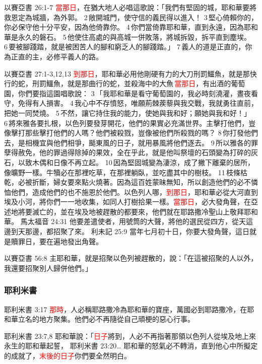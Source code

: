 以賽亞書 26:1-7
\textcolor{red}{當那日}，在猶大地人必唱這歌說：「我們有堅固的城，耶和華要將救恩定為城牆，為外郭。 2 敞開城門，使守信的義民得以進入！ 3 堅心倚賴你的，你必保守他十分平安，因為他倚靠你。 4 你們當倚靠耶和華，直到永遠，因為耶和華是永久的磐石。 5 他使住高處的與高城一併敗落，將城拆毀，拆平直到塵埃。 6 要被腳踐踏，就是被困苦人的腳和窮乏人的腳踐踏。」 7 義人的道是正直的，你為正直的主，必修平義人的路。

以賽亞書 27:1-3,12,13
\textcolor{red}{到那日}，耶和華必用他剛硬有力的大刀刑罰鱷魚，就是那快行的蛇，刑罰鱷魚，就是那曲行的蛇，並殺海中的大魚\textcolor{red}{ 當那日}，有出酒的葡萄園，你們要指這園唱歌說： 3 「我耶和華是看守葡萄園的，我必時刻澆灌，晝夜看守，免得有人損害。 4 我心中不存憤怒，唯願荊棘蒺藜與我交戰，我就勇往直前，把她一同焚燒。 5 不然，讓它持住我的能力，使她與我和好；願她與我和好！」 6 將來雅各要扎根，以色列要發芽開花，他們的果實必充滿世界。主擊打他們，豈像擊打那些擊打他們的人嗎？他們被殺戮，豈像被他們所殺戮的嗎？ 8 你打發他們去，是相機宜與他們相爭，颳東風的日子，就用暴風將他們逐去。 9 所以雅各的罪孽得赦免，他的罪過得除掉的果效，全在乎此，就是他叫祭壇的石頭變為打碎的灰石，以致木偶和日像不再立起。 10 因為堅固城變為淒涼，成了撇下離棄的居所，像曠野一樣。牛犢必在那裡吃草，在那裡躺臥，並吃盡其中的樹枝。 11 枝條枯乾，必被折斷，婦女要來點火燒著。因為這百姓蒙昧無知，所以創造他們的必不憐恤他們，造成他們的也不施恩於他們。以色列人哪，\textcolor{red}{到那日}，耶和華必從大河直到埃及小河，將你們一一地收集，如同人打樹拾果一樣。\textcolor{red}{當那日}，必大發角聲，在亞述地將要滅亡的，並在埃及地被趕散的都要來，他們就在耶路撒冷聖山上敬拜耶和華。
馬太福音 24:31
他要差遣使者，用號筒的大聲，將他的選民從四方，從天這邊到天那邊，都招聚了來。
利未記 25:9
當年七月初十日，你要大發角聲，這日就是贖罪日，要在遍地發出角聲。



以賽亞書 56:8
主耶和華，就是招聚以色列被趕散的，說：「在這被招聚的人以外，我還要招聚別人歸併他們。」


\subsubsection{耶利米書}
耶利米書 3:17
\textcolor{red}{那時}，人必稱耶路撒冷為耶和華的寶座，萬國必到耶路撒冷，在耶和華立名的地方聚集。他們必不再隨從自己頑梗的惡心行事。

耶利米書 23:7,8
耶和華說：「\textcolor{red}{日子}將到，人必不再指著那領以色列人從埃及地上來永生的耶和華起誓，
耶利米書 23:20…
耶和華的怒氣必不轉消，直到他心中所擬定的成就了，\textcolor{red}{末後的日子}你們要全然明白。


